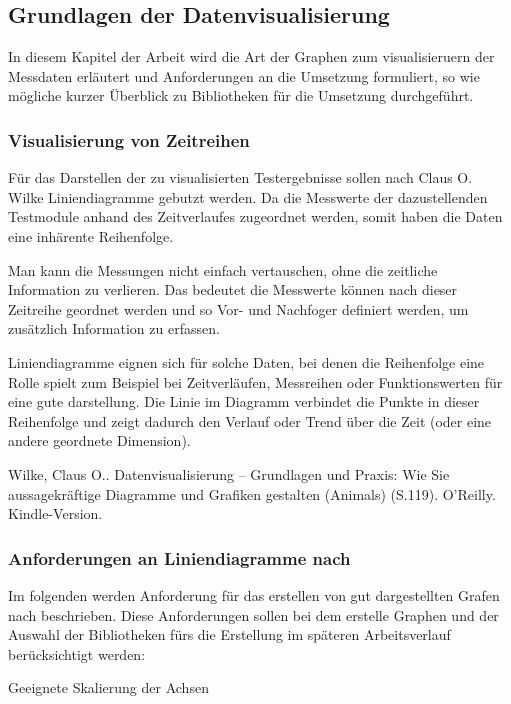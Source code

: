 \subsection{Grundlagen der Datenvisualisierung}
\label{subsec:grundlagen-der-datenvisualisierung}

In diesem Kapitel der Arbeit wird die Art der Graphen zum visualisieruern der Messdaten erläutert und Anforderungen an die Umsetzung formuliert,
so wie mögliche kurzer Überblick zu Bibliotheken für die Umsetzung durchgeführt.
\subsubsection{Visualisierung von Zeitreihen}

Für das Darstellen der zu visualisierten Testergebnisse sollen nach Claus O. Wilke Liniendiagramme gebutzt werden.
Da die Messwerte der dazustellenden Testmodule anhand des Zeitverlaufes zugeordnet werden, somit haben die Daten eine inhärente Reihenfolge.

Man kann die Messungen nicht einfach vertauschen, ohne die zeitliche Information zu verlieren.
Das bedeutet die Messwerte können nach dieser Zeitreihe geordnet werden und so Vor- und Nachfoger definiert werden, um zusätzlich Information zu erfassen.

Liniendiagramme eignen sich für solche Daten, bei denen die Reihenfolge eine Rolle spielt
zum Beispiel bei Zeitverläufen, Messreihen oder Funktionswerten für eine gute darstellung.
Die Linie im Diagramm verbindet die Punkte in dieser Reihenfolge und zeigt dadurch den Verlauf oder Trend über die Zeit (oder eine andere geordnete Dimension).\cite{Wilke2020Datenvisualisierung}


Wilke, Claus O.. Datenvisualisierung – Grundlagen und Praxis: Wie Sie aussagekräftige Diagramme und Grafiken gestalten (Animals) (S.119). O'Reilly. Kindle-Version.


\subsubsection{Anforderungen an Liniendiagramme nach }

Im folgenden werden Anforderung für das erstellen von gut dargestellten Grafen nach beschrieben. Diese Anforderungen sollen
bei dem erstelle Graphen und der Auswahl der Bibliotheken fürs die Erstellung im späteren Arbeitsverlauf berücksichtigt werden:

\item
Geeignete Skalierung der Achsen

